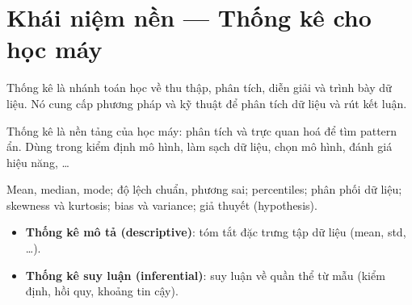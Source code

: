 \section{Khái niệm nền --- Thống kê cho học máy}
\label{sec:khai-niem-thong-ke}

\begin{dinhnghia}[title={Thống kê (Statistics)}]
Thống kê là nhánh toán học về thu thập, phân tích, diễn giải và trình bày dữ liệu.
Nó cung cấp phương pháp và kỹ thuật để phân tích dữ liệu và rút kết luận.
\end{dinhnghia}

\begin{ynghia}[title={Vai trò trong ML}]
Thống kê là nền tảng của học máy: phân tích và trực quan hoá để tìm pattern ẩn.
Dùng trong kiểm định mô hình, làm sạch dữ liệu, chọn mô hình, đánh giá hiệu năng, \ldots
\end{ynghia}

\begin{phuongphap}[title={Các khái niệm trong phần này}]
Mean, median, mode; độ lệch chuẩn, phương sai; percentiles; phân phối dữ liệu; skewness và kurtosis; bias và variance; giả thuyết (hypothesis).
\end{phuongphap}

\begin{phuongphap}[title={Hai nhánh thống kê}]
\begin{itemize}
  \item \textbf{Thống kê mô tả (descriptive)}: tóm tắt đặc trưng tập dữ liệu (mean, std, \ldots).
  \item \textbf{Thống kê suy luận (inferential)}: suy luận về quần thể từ mẫu (kiểm định, hồi quy, khoảng tin cậy).
\end{itemize}
\end{phuongphap}
